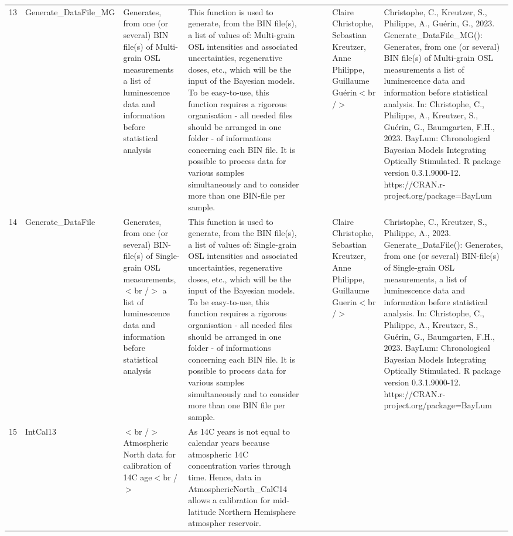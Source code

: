 \begin{table}[ht]
\begin{tabular}{rllllllll}
  13 & Generate\_DataFile\_MG & Generates, from one (or several) BIN file(s) of Multi-grain OSL measurements a list of luminescence data and information before statistical analysis & This function is used to generate, from the BIN file(s), a list of values of:  Multi-grain  OSL intensities and associated uncertainties, regenerative doses, etc., which will be the input of the Bayesian models. To be easy-to-use, this function requires a rigorous organisation - all needed files should be arranged in one folder - of informations concerning each BIN file.  It is possible to process data for various samples simultaneously and to consider more than one BIN-file per sample. &  &  &  & Claire Christophe, Sebastian Kreutzer, Anne Philippe, Guillaume Guérin$<$br /$>$ & Christophe, C., Kreutzer, S., Philippe, A., Guérin, G., 2023. Generate\_DataFile\_MG(): Generates, from one (or several) BIN file(s) of Multi-grain OSL measurements a list of luminescence data and information before statistical analysis. In: Christophe, C., Philippe, A., Kreutzer, S., Guérin, G., Baumgarten, F.H., 2023. BayLum: Chronological Bayesian Models Integrating Optically Stimulated. R package version 0.3.1.9000-12. https://CRAN.r-project.org/package=BayLum
 \\ 
  14 & Generate\_DataFile & Generates, from one (or several) BIN-file(s) of Single-grain OSL measurements,$<$br /$>$ a list of luminescence data and information before statistical analysis & This function is used to generate, from the BIN file(s), a list of values of: Single-grain  OSL intensities and associated uncertainties, regenerative doses, etc., which will be the input of the Bayesian models. To be easy-to-use, this function requires a rigorous organisation - all needed files should be arranged in one folder - of informations concerning each BIN file.   It is possible to process data for various samples simultaneously and to consider more than one BIN file per sample. &  &  &  & Claire Christophe, Sebastian Kreutzer, Anne Philippe, Guillaume Guerin$<$br /$>$ & Christophe, C., Kreutzer, S., Philippe, A., 2023. Generate\_DataFile(): Generates, from one (or several) BIN-file(s) of Single-grain OSL measurements, a list of luminescence data and information before statistical analysis. In: Christophe, C., Philippe, A., Kreutzer, S., Guérin, G., Baumgarten, F.H., 2023. BayLum: Chronological Bayesian Models Integrating Optically Stimulated. R package version 0.3.1.9000-12. https://CRAN.r-project.org/package=BayLum
 \\ 
  15 & IntCal13 & $<$br /$>$ Atmospheric North data for calibration of 14C age$<$br /$>$ & As 14C years is not equal to calendar years because atmospheric 14C concentration varies through time. Hence, data in AtmosphericNorth\_CalC14 allows a calibration for mid-latitude Northern Hemisphere atmospher reservoir. &  &  &  &  &  \\ 

\end{tabular}
\end{table}
